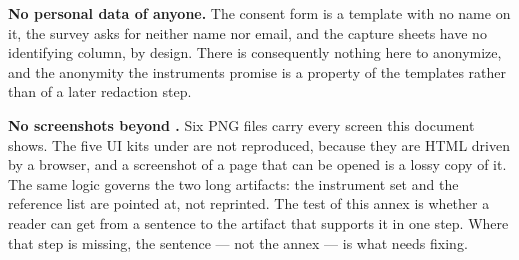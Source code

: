 \textbf{No personal data of anyone.} The consent form is a template with no name on it, the survey
asks for neither name nor email, and the capture sheets have no identifying column, by design.
There is consequently nothing here to anonymize, and the anonymity the instruments promise is a
property of the templates rather than of a later redaction step.

\textbf{No screenshots beyond .} Six PNG files carry every screen this
document shows. The five UI kits under  are not reproduced, because they are
HTML driven by a browser, and a screenshot of a page that can be opened is a lossy copy of it. The
same logic governs the two long artifacts: the instrument set and the reference list are pointed
at, not reprinted. The test of this annex is whether a reader can get from a sentence to the
artifact that supports it in one step. Where that step is missing, the sentence — not the annex —
is what needs fixing.
